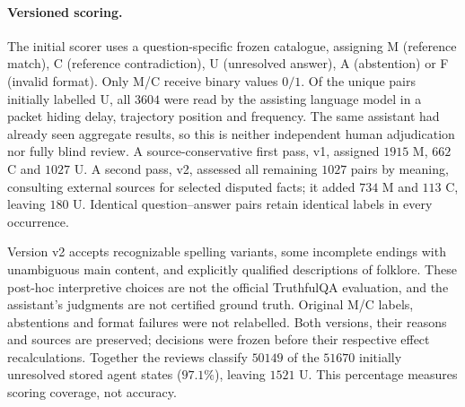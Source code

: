 \documentclass[11pt]{article}
\theoremstyle{definition}
\begin{document}
\paragraph{Versioned scoring.}
The initial scorer uses a question-specific frozen catalogue, assigning M (reference match),
C (reference contradiction), U (unresolved answer), A (abstention) or F (invalid format).
Only M/C receive binary values $0/1$. Of the unique pairs initially labelled U, all $3604$ were
read by the assisting language model in a packet hiding delay, trajectory position and frequency.
The same assistant had already seen aggregate results, so this is neither independent human
adjudication nor fully blind review. A source-conservative first pass, v1, assigned
$1915$ M, $662$ C and $1027$ U. A second pass, v2, assessed all remaining $1027$ pairs by meaning,
consulting external sources for selected disputed facts; it added $734$ M and $113$ C, leaving
$180$ U. Identical question--answer pairs retain identical labels in every occurrence.

Version v2 accepts recognizable spelling variants, some incomplete endings with unambiguous main
content, and explicitly qualified descriptions of folklore. These post-hoc interpretive choices
are not the official TruthfulQA evaluation, and the assistant's judgments are not certified ground
truth. Original M/C labels, abstentions and format failures were not relabelled. Both versions,
their reasons and sources are preserved; decisions were frozen before their respective effect
recalculations. Together the reviews classify $50149$ of the $51670$ initially unresolved stored
agent states ($97.1\%$), leaving $1521$ U. This percentage measures scoring coverage, not accuracy.
\end{document}
